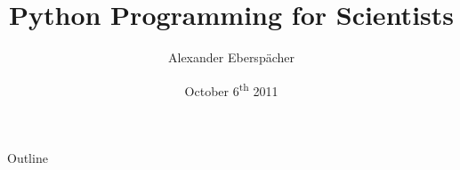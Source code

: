 \documentclass[compress]{beamer}
\title[] %
{Python Programming for Scientists}
\author[] %
{Alexander Eberspächer}
\date[]{October 6\textsuperscript{th} 2011} %
\begin{document}
\begin{frame} %
  \titlepage
  \thispagestyle{empty}
\end{frame}

\begin{frame}{Outline} %
  \tableofcontents
\end{frame}






\end{document}
